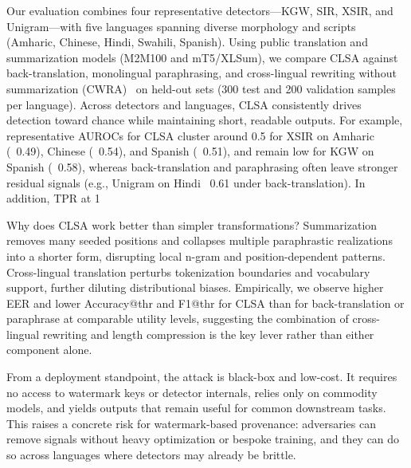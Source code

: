 \documentclass{article}
\begin{document}
Our evaluation combines four representative detectors—KGW, SIR, XSIR, and Unigram—with five languages spanning diverse morphology and scripts (Amharic, Chinese, Hindi, Swahili, Spanish). Using public translation and summarization models (M2M100 and mT5/XLSum), we compare CLSA against back-translation, monolingual paraphrasing, and cross-lingual rewriting without summarization (CWRA)~\citep{He2024cwra} on held-out sets (300 test and 200 validation samples per language). Across detectors and languages, CLSA consistently drives detection toward chance while maintaining short, readable outputs. For example, representative AUROCs for CLSA cluster around 0.5 for XSIR on Amharic (~0.49), Chinese (~0.54), and Spanish (~0.51), and remain low for KGW on Spanish (~0.58), whereas back-translation and paraphrasing often leave stronger residual signals (e.g., Unigram on Hindi ~0.61 under back-translation). In addition, TPR at 1%

Why does CLSA work better than simpler transformations? Summarization removes many seeded positions and collapses multiple paraphrastic realizations into a shorter form, disrupting local n-gram and position-dependent patterns. Cross-lingual translation perturbs tokenization boundaries and vocabulary support, further diluting distributional biases. Empirically, we observe higher EER and lower Accuracy@thr and F1@thr for CLSA than for back-translation or paraphrase at comparable utility levels, suggesting the combination of cross-lingual rewriting and length compression is the key lever rather than either component alone.

From a deployment standpoint, the attack is black-box and low-cost. It requires no access to watermark keys or detector internals, relies only on commodity models, and yields outputs that remain useful for common downstream tasks. This raises a concrete risk for watermark-based provenance: adversaries can remove signals without heavy optimization or bespoke training, and they can do so across languages where detectors may already be brittle.
\end{document}
